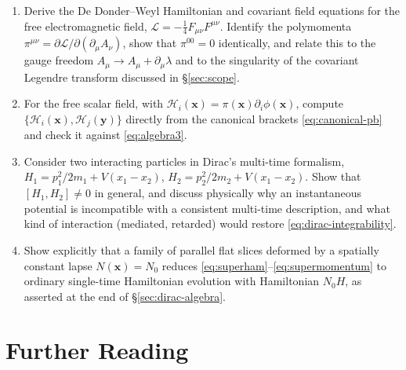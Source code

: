 \documentclass[11pt]{book}
\newcommand{\Lag}{\mathcal{L}}
\newcommand{\Ham}{\mathcal{H}}
\theoremstyle{definition}
\theoremstyle{remark}
\begin{document}
\begin{enumerate}
\item Derive the De Donder--Weyl Hamiltonian and covariant field equations for the free electromagnetic field, $\Lag=-\tfrac14F_{\mu\nu}F^{\mu\nu}$. Identify the polymomenta $\pi^{\mu\nu}=\partial\Lag/\partial(\partial_\mu A_\nu)$, show that $\pi^{00}=0$ identically, and relate this to the gauge freedom $A_\mu\to A_\mu+\partial_\mu\lambda$ and to the singularity of the covariant Legendre transform discussed in \S\ref{sec:scope}.

\item For the free scalar field, with $\Ham_i(\mathbf{x})=\pi(\mathbf{x})\partial_i\phi(\mathbf{x})$, compute $\{\Ham_i(\mathbf{x}),\Ham_j(\mathbf{y})\}$ directly from the canonical brackets \eqref{eq:canonical-pb} and check it against \eqref{eq:algebra3}.

\item Consider two interacting particles in Dirac's multi-time formalism, $H_1=p_1^2/2m_1+V(x_1-x_2)$, $H_2=p_2^2/2m_2+V(x_1-x_2)$. Show that $[H_1,H_2]\neq0$ in general, and discuss physically why an instantaneous potential is incompatible with a consistent multi-time description, and what kind of interaction (mediated, retarded) would restore \eqref{eq:dirac-integrability}.

\item Show explicitly that a family of parallel flat slices deformed by a spatially constant lapse $N(\mathbf{x})=N_0$ reduces \eqref{eq:superham}--\eqref{eq:supermomentum} to ordinary single-time Hamiltonian evolution with Hamiltonian $N_0 H$, as asserted at the end of \S\ref{sec:dirac-algebra}.
\end{enumerate}

\section*{Further Reading}
\end{document}
